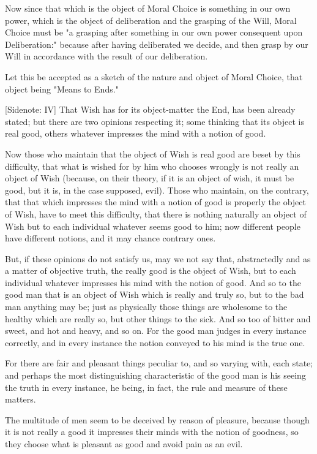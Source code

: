Now since that which is the object of Moral Choice is something in our
own power, which is the object of deliberation and the grasping of the
Will, Moral Choice must be "a grasping after something in our own power
consequent upon Deliberation:" because after having deliberated we
decide, and then grasp by our Will in accordance with the result of our
deliberation.

Let this be accepted as a sketch of the nature and object of Moral
Choice, that object being "Means to Ends."

[Sidenote: IV] That Wish has for its object-matter the End, has been
already stated; but there are two opinions respecting it; some thinking
that its object is real good, others whatever impresses the mind with a
notion of good.

Now those who maintain that the object of Wish is real good are beset by
this difficulty, that what is wished for by him who chooses wrongly is
not really an object of Wish (because, on their theory, if it is an
object of wish, it must be good, but it is, in the case supposed, evil).
Those who maintain, on the contrary, that that which impresses the mind
with a notion of good is properly the object of Wish, have to meet this
difficulty, that there is nothing naturally an object of Wish but to
each individual whatever seems good to him; now different people have
different notions, and it may chance contrary ones.

But, if these opinions do not satisfy us, may we not say that,
abstractedly and as a matter of objective truth, the really good is the
object of Wish, but to each individual whatever impresses his mind with
the notion of good. And so to the good man that is an object of Wish
which is really and truly so, but to the bad man anything may be; just
as physically those things are wholesome to the healthy which are really
so, but other things to the sick. And so too of bitter and sweet, and
hot and heavy, and so on. For the good man judges in every instance
correctly, and in every instance the notion conveyed to his mind is the
true one.

For there are fair and pleasant things peculiar to, and so varying with,
each state; and perhaps the most distinguishing characteristic of the
good man is his seeing the truth in every instance, he being, in fact,
the rule and measure of these matters.

The multitude of men seem to be deceived by reason of pleasure, because
though it is not really a good it impresses their minds with the notion
of goodness, so they choose what is pleasant as good and avoid pain as
an evil.

